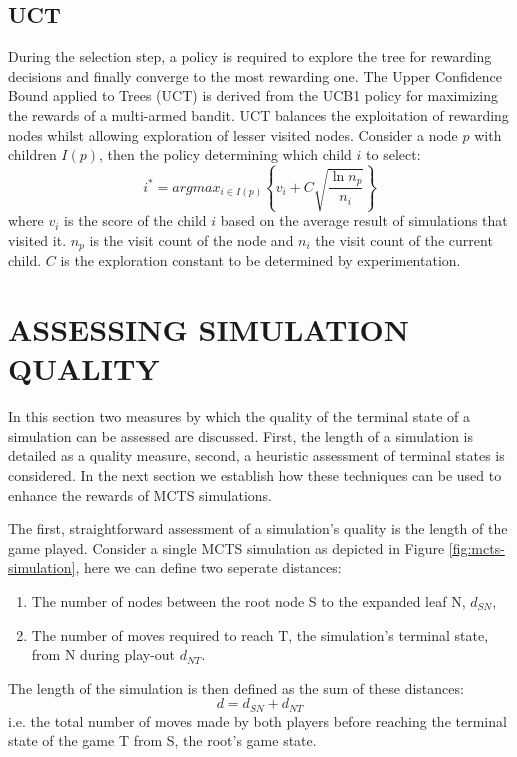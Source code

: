 \documentclass{ecai2014}
\newcommand{\node}[1]{{\fontfamily{phv}\selectfont#1}}
\begin{document}
\subsection{UCT}
\label{subsec:uct}
During the selection step, a policy is required to explore the tree for rewarding decisions and finally converge to the most rewarding one. The Upper Confidence Bound applied to Trees (UCT) \cite{kocsis2006bandit} is derived from the UCB1 policy \cite{auer2002using} for maximizing the rewards of a multi-armed bandit. UCT balances the exploitation of rewarding nodes whilst allowing exploration of lesser visited nodes. Consider a node $p$ with children $I(p)$, then the policy determining which child $i$ to select:
\begin{equation}
\label{eq:uct}
i^* = argmax_{i \in I(p)}\left\{ v_i + C \sqrt{ \frac{\ln{n_p}}{n_i}}\right\}
\end{equation}
where $v_i$ is the score of the child $i$ based on the average result of simulations that visited it. $n_p$ is the visit count of the node and $n_i$ the visit count of the current child. $C$ is the exploration constant to be determined by experimentation.

\section{ASSESSING SIMULATION QUALITY}
\label{sec:poqual}

In this section two measures by which the quality of the terminal state of a simulation can be assessed are discussed. First, the length of a simulation is detailed as a quality measure, second, a heuristic assessment of terminal states is considered. In the next section we establish how these techniques can be used to enhance the rewards of MCTS simulations.

The first, straightforward assessment of a simulation's quality is the length of the game played. Consider a single MCTS simulation as depicted in Figure \ref{fig:mcts-simulation}, here we can define two seperate distances: 
\begin{enumerate}
\item The number of nodes between the root node \node{S} to the expanded leaf \node{N}, $d_{SN}$,
\item The number of moves required to reach \node{T}, the simulation's terminal state, from \node{N} during play-out $d_{NT}$.
\end{enumerate}
The length of the simulation is then defined as the sum of these distances:
\begin{equation}
d = d_{SN} + d_{NT}
\label{eq:m_ST}
\end{equation}
i.e. the total number of moves made by both players before reaching the terminal state of the game \node{T} from \node{S}, the root's game state.
\end{document}
